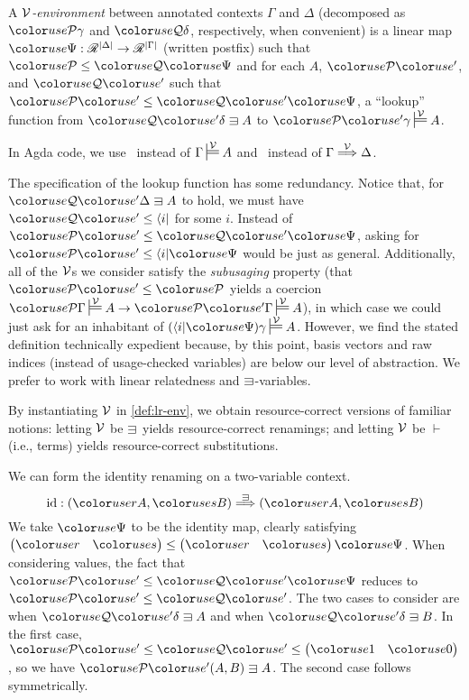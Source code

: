 
\begin{definition}[Environment]\label{def:lr-env}
  A \emph{$\mathcal V$-environment} between annotated contexts $\Gamma$ and
  $\Delta$ (decomposed as $\grP\gamma$ and $\grQ\delta$, respectively,
  when convenient) is a linear map
  $\gr\Psi : \Ann^{\size\Delta} \to \Ann^{\size\Gamma}$ (written
  postfix) such that $\grP \leq \grQ\gr\Psi$ and for each $A$,
  $\grPprime$, and $\grQprime$ such that
  $\grPprime \leq \grQprime\gr\Psi$, a ``lookup'' function from
  $\grQprime\delta \sqni A$ to $\grPprime\gamma \sdtstile{}\V A$.
\end{definition}

In Agda code, we use \ instead of
$\Gamma \sdtstile{}\V A$ and \ instead of
$\Gamma \stackrel{\mathcal V}\Longrightarrow \Delta$.

The specification of the lookup function has some redundancy.
Notice that, for $\grQprime\Delta \sqni A$ to hold, we must have
$\grQprime \leq \langle i \rvert$ for some $i$.
Instead of $\grPprime \leq \grQprime\gr\Psi$, asking for
$\grPprime \leq \langle i \rvert\gr\Psi$ would be just as general.
Additionally, all of the $\mathcal V$s we consider satisfy the \emph{subusaging}
property (that $\grPprime \leq \grP$ yields a coercion
$\grP\Gamma \sdtstile{}\V A \to \grPprime\Gamma \sdtstile{}\V A$), in which case
we could just ask for an inhabitant of
$\plr{\langle i \rvert\gr\Psi}\gamma \sdtstile{}\V A$.
However, we find the stated definition technically expedient because, by this
point, basis vectors and raw indices (instead of usage-checked variables) are
below our level of abstraction.
We prefer to work with linear relatedness and $\sqni$-variables.

By instantiating $\mathcal V$ in \cref{def:lr-env}, we obtain resource-correct versions
of familiar
notions: letting $\mathcal V$ be $\sqni$ yields resource-correct renamings;
and letting $\mathcal V$ be $\vdash$ (i.e., terms) yields resource-correct
substitutions.

\begin{example}
  We can form the identity renaming on a two-variable context.
  \[
    \id : \plr{\gr rA, \gr sB} \env\sqni \plr{\gr rA, \gr sB}
  \]
  We take $\gr\Psi$ to be the identity map, clearly satisfying
  \(
    \begin{pmatrix} \gr r & \gr s \end{pmatrix} \leq
    \begin{pmatrix} \gr r & \gr s \end{pmatrix}\gr\Psi
  \).
  When considering values, the fact that $\grPprime \leq \grQprime\gr\Psi$
  reduces to $\grPprime \leq \grQprime$.
  The two cases to consider are when $\grQprime\delta \sqni A$ and when
  $\grQprime\delta \sqni B$.
  In the first case, $\grPprime \leq \grQprime \leq
  \begin{pmatrix} \gr1 & \gr0 \end{pmatrix}$, so we have
  $\grPprime\plr{A, B} \sqni A$.
  The second case follows symmetrically.
\end{example}

